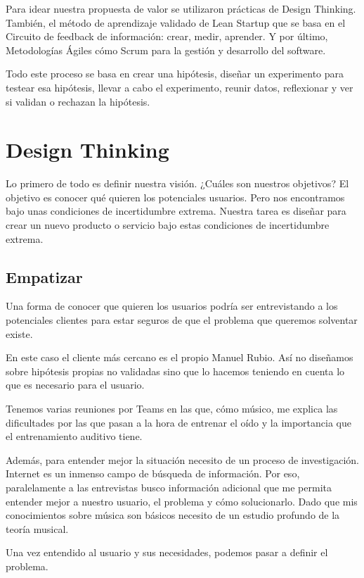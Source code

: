 \documentclass[12pt,twoside,titlepage]{report}
\begin{document}
{Para idear nuestra propuesta de valor se utilizaron prácticas de Design Thinking. También, el método de aprendizaje validado de Lean Startup que se basa en el Circuito de feedback de información: crear, medir, aprender. Y por último, Metodologías Ágiles cómo Scrum para la gestión y desarrollo del software.

Todo este proceso se basa en crear una hipótesis, diseñar un experimento para testear esa hipótesis, llevar a cabo el experimento, reunir datos, reflexionar y ver si validan o rechazan la hipótesis.

\section{Design Thinking}

Lo primero de todo es definir nuestra visión. ¿Cuáles son nuestros objetivos? El objetivo es conocer qué quieren los potenciales usuarios. Pero nos encontramos bajo unas condiciones de incertidumbre extrema. Nuestra tarea es diseñar para crear un nuevo producto o servicio bajo estas condiciones de incertidumbre extrema.

\subsection{Empatizar}

Una forma de conocer que quieren los usuarios podría ser entrevistando a los potenciales clientes para estar seguros de que el problema que queremos solventar existe.

En este caso el cliente más cercano es el propio Manuel Rubio. Así no diseñamos sobre hipótesis propias no validadas sino que lo hacemos teniendo en cuenta lo que es necesario para el usuario.

Tenemos varias reuniones por Teams en las que, cómo músico, me explica las dificultades por las que pasan a la hora de entrenar el oído y la importancia que el entrenamiento auditivo tiene.

Además, para entender mejor la situación necesito de un proceso de investigación. Internet es un inmenso campo de búsqueda de información. Por eso, paralelamente a las entrevistas busco información adicional que me permita entender mejor a nuestro usuario, el problema y cómo solucionarlo. Dado que mis conocimientos sobre música son básicos necesito de un estudio profundo de la teoría musical. 

Una vez entendido al usuario y sus necesidades, podemos pasar a definir el problema.

}
\end{document}

